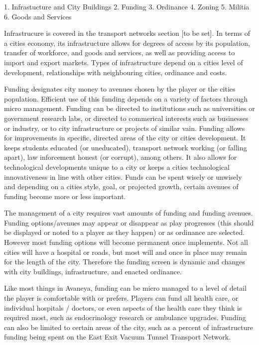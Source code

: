 
1.  Infrastucture and City Buildings
2.  Funding
3.  Ordinance
4.  Zoning
5.  Militia
6.  Goods and Services







Infrastrucure is covered in the transport networks section [to be set]. In terms of a cities economy, its infrastructure allows for degrees of access by its population, transfer of workforce, and goods and services, as well as providing access to import and export markets. Types of infrastructure depend on a cities level of development, relationships with neighbouring cities, ordinance and costs. 



Funding designates city money to avenues chosen by the player or the cities population. Efficient use of this funding depends on a variety of factors through micro management. Funding can be directed to institutions such as universities or government research labs, or directed to commerical interests such as businesses or industry, or to city infrastructure or projects of similar vain. Funding allows for improvements in specific, directed areas of the city or cities development. It keeps students educated (or uneducated), transport network working (or falling apart), law inforcement honest (or corrupt), among others. It also allows for technological developments unique to a city or keeps a cities technological innovativeness in line with other cities. Funds can be spent wisely or unwisely and depending on a cities style, goal, or projected growth, certain avenues of funding become more or less important.

The management of a city requires vast amounts of funding and funding avenues. Funding options/avenues may appear or disappear as play progresses (this should be displayed or noted to a player as they happen) or as ordinance are selected. However most funding options will become permanent once implements. Not all cities will have a hospital or roads, but most will and once in place may remain for the length of the city. Therefore the funding screen is dynamic and changes with city buildings, infrastructure, and enacted ordinance.

Like most things in Avaneya, funding can be micro managed to a level of detail the player is comfortable with or prefers. Players can fund all health care, or individual hospitals / doctors, or even aspects of the health care they think is required most, such as endocrinology research or ambulance upgrades. Funding can also be limited to certain areas of the city, such as a percent of infrastructure funding being spent on the East Exit Vacuum Tunnel Transport Network.


